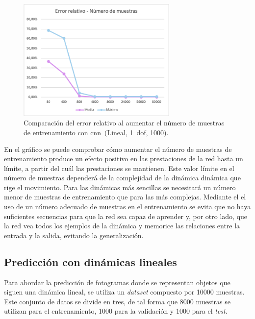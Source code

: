 \begin{figure}[H]
		\begin{center}
			\includegraphics[width=0.7\textwidth]{ figures/test_raw/NOREC/n_muestras.png}
			\caption{Comparación del error relativo al aumentar el número de muestras de entrenamiento con \acrshort{cnn}~(Lineal, 1~\acrshort{dof}, 1000).}
			\label{fig.n_muestras}
		\end{center}
\end{figure}
\vspace{-10pt}


En el gráfico se puede comprobar cómo aumentar el número de muestras de entrenamiento produce un efecto positivo en las prestaciones de la red hasta un límite, a partir del cuál las prestaciones se mantienen. Este valor límite en el número de muestras dependerá de la complejidad de la dinámica  dinámica que rige el movimiento. Para las dinámicas más sencillas se necesitará un número menor de muestras de entrenamiento que para las más complejas. Mediante el el uso de un número adecuado de muestras en el entrenamiento se evita que no haya suficientes secuencias para que la red sea capaz de aprender y, por otro lado, que la red vea todos los ejemplos de la dinámica y memorice las relaciones entre la entrada y la salida, evitando la generalización.

\subsection{Predicción con dinámicas lineales}
Para abordar la predicción de fotogramas donde se representan objetos que siguen una dinámica lineal, se utiliza un \textit{dataset} compuesto por 10000 muestras. Este conjunto de datos se divide en tres, de tal forma que 8000 muestras se utilizan para el entrenamiento, 1000 para la validación y 1000 para el \textit{test}.\\

